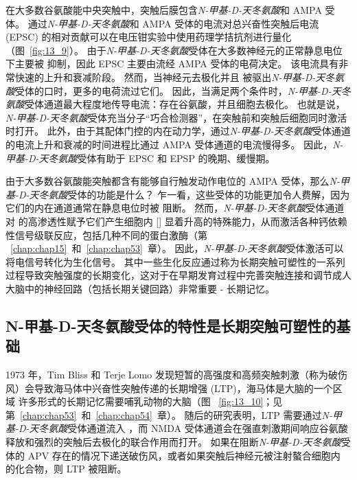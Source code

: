 在大多数谷氨酸能中央突触中，突触后膜包含\textit{N-甲基-D-天冬氨酸}和 AMPA 受体。
通过\textit{N-甲基-D-天冬氨酸}和 AMPA 受体的电流对总兴奋性突触后电流 (EPSC) 的相对贡献可以在电压钳实验中使用药理学拮抗剂进行量化（图~\ref{fig:13_9}）。
由于\textit{N-甲基-D-天冬氨酸}受体在大多数神经元的正常静息电位下主要被  抑制，因此 EPSC 主要由流经 AMPA 受体的电荷决定。
该电流具有非常快速的上升和衰减阶段。
然而，当神经元去极化并且  被驱出\textit{N-甲基-D-天冬氨酸}受体的口时，更多的电荷流过它们。
因此，当满足两个条件时，\textit{N-甲基-D-天冬氨酸}受体通道最大程度地传导电流：存在谷氨酸，并且细胞去极化。
也就是说，\textit{N-甲基-D-天冬氨酸}受体充当分子“巧合检测器”，在突触前和突触后细胞同时激活时打开。
此外，由于其配体门控的内在动力学，通过\textit{N-甲基-D-天冬氨酸}受体通道的电流上升和衰减的时间进程比通过 AMPA 受体通道的电流慢得多。
因此，\textit{N-甲基-D-天冬氨酸}受体有助于 EPSC 和 EPSP 的晚期、缓慢期。


由于大多数谷氨酸能突触都含有能够自行触发动作电位的 AMPA 受体，那么\textit{N-甲基-D-天冬氨酸}受体的功能是什么？
乍一看，这些受体的功能更加令人费解，因为它们的内在通道通常在静息电位时被  阻断。
然而，\textit{N-甲基-D-天冬氨酸}受体通道对  的高渗透性赋予它们产生细胞内 [] 显着升高的特殊能力，从而激活各种钙依赖性信号级联反应，包括几种不同的蛋白激酶（第 ~\ref{chap:chap15}~和~\ref{chap:chap53}~章）。
因此，\textit{N-甲基-D-天冬氨酸}受体激活可以将电信号转化为生化信号。 其中一些生化反应通过称为长期突触可塑性的一系列过程导致突触强度的长期变化，这对于在早期发育过程中完善突触连接和调节成人大脑中的神经回路（包括长期关键回路）非常重要 - 长期记忆。



\subsection{N-甲基-D-天冬氨酸受体的特性是长期突触可塑性的基础}

1973 年，Tim Bliss 和 Terje Lomo 发现短暂的高强度和高频突触刺激（称为破伤风）会导致海马体中兴奋性突触传递的长期增强 (LTP)，海马体是大脑的一个区域 许多形式的长期记忆需要哺乳动物的大脑（图 ~\ref{fig:13_10}；见第~\ref{chap:chap53}~和~\ref{chap:chap54}~章）。
随后的研究表明，LTP 需要通过\textit{N-甲基-D-天冬氨酸}受体通道流入 ，而 NMDA 受体通道会在强直刺激期间响应谷氨酸释放和强烈的突触后去极化的联合作用而打开。
如果在阻断\textit{N-甲基-D-天冬氨酸}受体的 APV 存在的情况下递送破伤风，或者如果突触后神经元被注射螯合细胞内  的化合物，则 LTP 被阻断。



